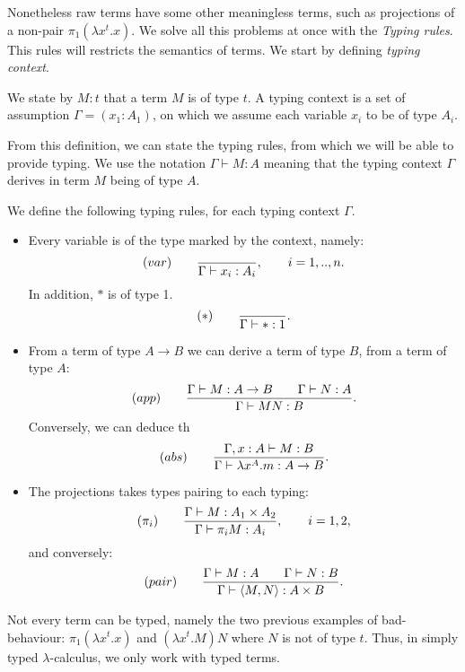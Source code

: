 Nonetheless raw terms have some other meaningless terms, such as projections of a non-pair $\pi_1(\lambda x^t.x)$. We solve all this problems at once with the \emph {Typing rules}. This rules will restricts the semantics of terms. We start by defining \emph{typing context}.

\begin{definition}
  We state by $M:t$  that a term $M$ is of type $t$. A typing context is a set of assumption $\Gamma = (x_1:A_1)$, on which we assume each variable $x_i$ to be of type $A_i$.
\end{definition}

\begin{remark}
  From this definition, we can state the typing rules, from which we will be able to provide typing. We use the notation $\Gamma \vdash M:A$ meaning that the typing context $\Gamma$ derives in term $M$ being of type $A$. 
\end{remark}


\begin{definition}\label{def:typing-rules}
  We define the following typing rules, for each typing context $\Gamma$.
  \begin{itemize}
  \item Every variable is of the type marked by the context, namely:
    $$  (var)\qquad  {\displaystyle \over \Gamma \vdash x_i:A_i},\qquad  i=  1,..,n.$$
    In addition,  $*$ is of type 1.
    $$  (*)\qquad  {\displaystyle \over \Gamma\vdash *:1}.$$

  \item From a term of type $A\to B$ we can derive a term of type $B$, from a term of type $A$:
    $$(app)\qquad  {\displaystyle \Gamma \vdash M:A\to B\qquad \Gamma \vdash N:A      \over \Gamma \vdash MN:B}.$$
    Conversely, we can deduce th
    $$(abs)\qquad  {\displaystyle \Gamma, x: A\vdash M: B  \over \Gamma \vdash \lambda x^A.m:A\to B}.$$
  \item The projections takes types pairing to each typing:
    $$(\pi_i) \qquad {\displaystyle \Gamma\vdash M: A_1\times A_2 \over \Gamma \vdash \pi_i M: A_i},\qquad i=1,2,$$
    and conversely:
    $$(pair) \qquad {\displaystyle \Gamma\vdash M: A\qquad \Gamma\vdash N: B \over \Gamma \vdash \langle M, N\rangle:  A\times B}.$$
  \end{itemize}
\end{definition}



\begin{remark}
  Not every term can be typed, namely the two previous examples of bad-behaviour: $\pi_1(\lambda x^t. x)$ and $(\lambda x^t.M)N$ where $N$ is not of type $t$. Thus, in simply typed $\lambda$-calculus, we only work with typed terms.
\end{remark}

